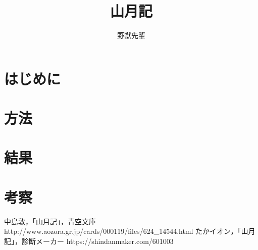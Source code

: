 \documentclass[uplatex]{jsarticle}
\begin{document}
\title{山月記}
\author{野獣先輩}

\maketitle
\thispagestyle{empty}

\section{はじめに}

\section{方法}

\section{結果}

\section{考察}

\begin{thebibliography}{2}
 中島敦，「山月記」，青空文庫 http://www.aozora.gr.jp/cards/000119/files/624\_14544.html
 たかイオン，「山月記」，診断メーカー https://shindanmaker.com/601003
\end{thebibliography}
\end{document}
